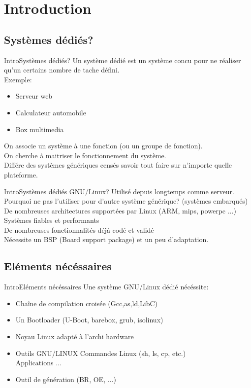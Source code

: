 \section{Introduction}

\subsection{Systèmes dédiés?}
\begin{frame}{Intro}{Systèmes dédiés?}
	Un système dédié est un système concu pour ne réaliser qu'un certains nombre de tache défini.\\
	Exemple:
	\begin{itemize}
		\item
			Serveur web
		\item
			Calculateur automobile
		\item
			Box multimedia
	\end{itemize}
	On associe un système à une fonction (ou un groupe de fonction).\\
	On cherche à maitriser le fonctionnement du système.\\
	Différe des systèmes génériques censés savoir tout faire sur n'importe quelle plateforme.\\
\end{frame}

\begin{frame}{Intro}{Systèmes dédiés GNU/Linux?}
	Utilisé depuis longtemps comme serveur.\\
	Pourquoi ne pas l'utiliser pour d'autre système générique? (systèmes embarqués)\\
	De nombreuses architectures supportées par Linux (ARM, mips, powerpc ...)\\
	Systèmes fiables et performants\\
	De nombreuses fonctionnalités déjà codé et validé\\
	Nécessite un BSP (Board support package) et un peu d'adaptation.\\
\end{frame}

\subsection{Eléments nécéssaires}
\begin{frame}{Intro}{Eléments nécéssaires}
	Une système GNU/Linux dédié nécéssite:
	\begin{itemize}
		\item
			Chaîne de compilation croisée (Gcc,as,ld,LibC)
		\item
			Un Bootloader (U-Boot, barebox, grub, isolinux)
		\item
			Noyau Linux adapté à l'archi hardware
		\item
			Outils GNU/LINUX Commandes Linux (sh, ls, cp, etc.)\\
			Applications ...
		\item
			Outil de génération (BR, OE, ...)
	\end{itemize}
\end{frame}